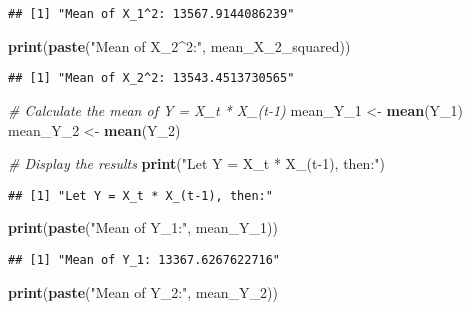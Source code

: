 \documentclass[
]{article}
\newenvironment{Shaded}{\begin{snugshade}}{\end{snugshade}}
\newcommand{\CommentTok}[1]{\textcolor[rgb]{0.56,0.35,0.01}{\textit{#1}}}
\newcommand{\FunctionTok}[1]{\textcolor[rgb]{0.13,0.29,0.53}{\textbf{#1}}}
\newcommand{\NormalTok}[1]{#1}
\newcommand{\OtherTok}[1]{\textcolor[rgb]{0.56,0.35,0.01}{#1}}
\newcommand{\StringTok}[1]{\textcolor[rgb]{0.31,0.60,0.02}{#1}}
\begin{document}
\begin{verbatim}
## [1] "Mean of X_1^2: 13567.9144086239"
\end{verbatim}

\begin{Shaded}
\begin{Highlighting}[]
\FunctionTok{print}\NormalTok{(}\FunctionTok{paste}\NormalTok{(}\StringTok{"Mean of X\_2\^{}2:"}\NormalTok{, mean\_X\_2\_squared))}
\end{Highlighting}
\end{Shaded}

\begin{verbatim}
## [1] "Mean of X_2^2: 13543.4513730565"
\end{verbatim}

\begin{Shaded}
\begin{Highlighting}[]
\CommentTok{\# Calculate the mean of Y = X\_t * X\_(t{-}1)}
\NormalTok{mean\_Y\_1 }\OtherTok{\textless{}{-}} \FunctionTok{mean}\NormalTok{(Y\_1)}
\NormalTok{mean\_Y\_2 }\OtherTok{\textless{}{-}} \FunctionTok{mean}\NormalTok{(Y\_2)}

\CommentTok{\# Display the results}
\FunctionTok{print}\NormalTok{(}\StringTok{"Let Y = X\_t * X\_(t{-}1), then:"}\NormalTok{)}
\end{Highlighting}
\end{Shaded}

\begin{verbatim}
## [1] "Let Y = X_t * X_(t-1), then:"
\end{verbatim}

\begin{Shaded}
\begin{Highlighting}[]
\FunctionTok{print}\NormalTok{(}\FunctionTok{paste}\NormalTok{(}\StringTok{"Mean of Y\_1:"}\NormalTok{, mean\_Y\_1))}
\end{Highlighting}
\end{Shaded}

\begin{verbatim}
## [1] "Mean of Y_1: 13367.6267622716"
\end{verbatim}

\begin{Shaded}
\begin{Highlighting}[]
\FunctionTok{print}\NormalTok{(}\FunctionTok{paste}\NormalTok{(}\StringTok{"Mean of Y\_2:"}\NormalTok{, mean\_Y\_2))}
\end{Highlighting}
\end{Shaded}
\end{document}
